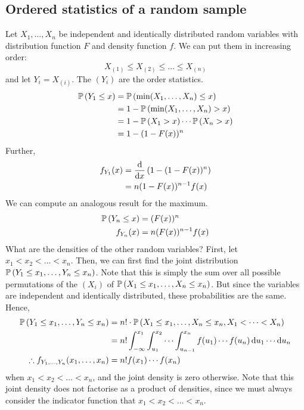 \subsection{Ordered statistics of a random sample}
Let \(X_1, \dots, X_n\) be independent and identically distributed random variables with distribution function \(F\) and density function \(f\).
We can put them in increasing order:
\[
	X_{(1)} \leq X_{(2)} \leq \dots \leq X_{(n)}
\]
and let \(Y_i = X_{(i)}\).
The \((Y_i)\) are the order statistics.
\begin{align*}
	\mathbb{P}\left({Y_1 \leq x}\right) & = \mathbb{P}\left({\min(X_1, \dots, X_n) \leq x}\right)    \\
	                  & = 1 - \mathbb{P}\left({\min(X_1, \dots, X_n) > x}\right)   \\
	                  & = 1 - \mathbb{P}\left({X_1 > x}\right)\cdots\mathbb{P}\left({X_n > x}\right) \\
	                  & = 1 - (1 - F(x))^n
\end{align*}
Further,
\begin{align*}
	f_{Y_1}(x) & = \dv{x}\left( 1 - (1 - F(x))^n \right) \\
	           & = n (1 - F(x))^{n-1} f(x)
\end{align*}
We can compute an analogous result for the maximum.
\begin{align*}
	\mathbb{P}\left({Y_n \leq x}\right) & = (F(x))^n           \\
	f_{Y_n}(x)        & = n(F(x))^{n-1} f(x)
\end{align*}
What are the densities of the other random variables?
First, let \(x_1 < x_2 < \dots < x_n\).
Then, we can first find the joint distribution \(\mathbb{P}\left({Y_1 \leq x_1, \dots, Y_n \leq x_n}\right)\).
Note that this is simply the sum over all possible permutations of the \((X_i)\) of \(\mathbb{P}\left({X_1 \leq x_1, \dots, X_n \leq x_n}\right)\).
But since the variables are independent and identically distributed, these probabilities are the same.
Hence,
\begin{align*}
	\mathbb{P}\left({Y_1 \leq x_1, \dots, Y_n \leq x_n}\right)        & = n!
	\cdot \mathbb{P}\left({X_1 \leq x_1, \dots, X_n \leq x_n, X_1 < \dots < X_n}\right)                                               \\
	                                                & = n!
	\int_{-\infty}^{x_1} \int_{u_1}^{x_2} \cdots \int_{u_{n-1}}^{x_n} f(u_1) \cdots f(u_n) \dd{u_1} \cdots \dd{u_n} \\
	\therefore f_{Y_1, \dots, Y_n}(x_1, \dots, x_n) & = n!
	f(x_1) \cdots f(x_n)
\end{align*}
when \(x_1 < x_2 < \dots < x_n\), and the joint density is zero otherwise.
Note that this joint density does not factorise as a product of densities, since we must always consider the indicator function that \(x_1 < x_2 < \dots < x_n\).

